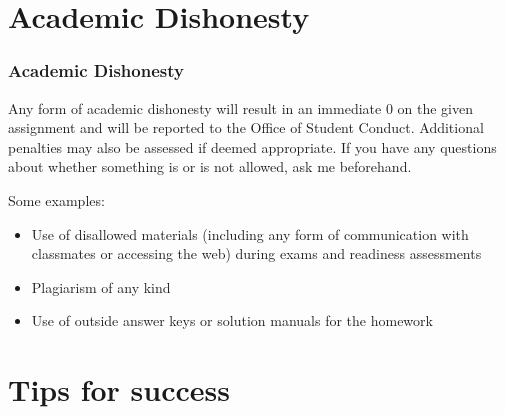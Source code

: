 \documentclass[slidestop,compress,mathserif,12pt,t,professionalfonts,xcolor=table]{beamer}
\begin{document}

\section{Academic Dishonesty}


\begin{frame}
\frametitle{Academic Dishonesty}

Any form of academic dishonesty will result in an immediate 0 on the given assignment 
and will be reported to the Office of Student Conduct. Additional penalties may also 
be assessed if deemed appropriate. If you have any questions about whether something 
is or is not allowed, ask me beforehand.

Some examples:

\begin{itemize}

\item Use of disallowed materials (including any form of communication with classmates 
or accessing the web) during exams and readiness assessments

\item Plagiarism of any kind

\item Use of outside answer keys or solution manuals for the homework

\end{itemize}

\end{frame}


\section{Tips for success}

\end{document}
